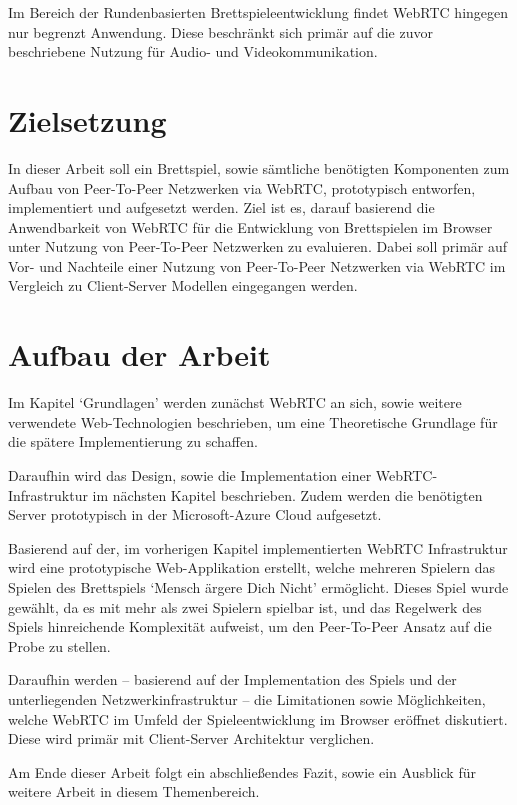 Im Bereich der Rundenbasierten Brettspieleentwicklung findet WebRTC hingegen nur begrenzt Anwendung. Diese beschränkt sich primär auf die zuvor beschriebene Nutzung für Audio- und Videokommunikation.

\section{Zielsetzung}
In dieser Arbeit soll ein Brettspiel, sowie sämtliche benötigten Komponenten zum Aufbau von Peer-To-Peer Netzwerken via \acs{WebRTC}, prototypisch entworfen, implementiert und aufgesetzt werden. Ziel ist es, darauf basierend die Anwendbarkeit von \acs{WebRTC} für die Entwicklung von Brettspielen im Browser unter Nutzung von Peer-To-Peer Netzwerken zu evaluieren. Dabei soll primär auf Vor- und Nachteile einer Nutzung von Peer-To-Peer Netzwerken via \acs{WebRTC} im Vergleich zu Client-Server Modellen eingegangen werden.

\section{Aufbau der Arbeit}
Im Kapitel ‘Grundlagen’ werden zunächst \acs{WebRTC} an sich, sowie weitere verwendete Web-Technologien beschrieben, um eine Theoretische Grundlage für die spätere Implementierung zu schaffen.\par

Daraufhin wird das Design, sowie die Implementation einer \acs{WebRTC}-Infrastruktur im nächsten Kapitel beschrieben. Zudem werden die benötigten Server prototypisch in der Microsoft-Azure Cloud aufgesetzt.\par

Basierend auf der, im vorherigen Kapitel implementierten WebRTC Infrastruktur wird eine prototypische Web-Applikation erstellt, welche mehreren Spielern das Spielen des Brettspiels ‘Mensch ärgere Dich Nicht’ ermöglicht. Dieses Spiel wurde gewählt, da es mit mehr als zwei Spielern spielbar ist, und das Regelwerk des Spiels hinreichende Komplexität aufweist, um den Peer-To-Peer Ansatz auf die Probe zu stellen.\par

Daraufhin werden -- basierend auf der Implementation des Spiels und der unterliegenden Netzwerkinfrastruktur -- die Limitationen sowie Möglichkeiten, welche WebRTC im Umfeld der Spieleentwicklung im Browser eröffnet diskutiert. Diese wird primär mit Client-Server Architektur verglichen.\par

Am Ende dieser Arbeit folgt ein abschließendes Fazit, sowie ein Ausblick für weitere Arbeit in diesem Themenbereich.
